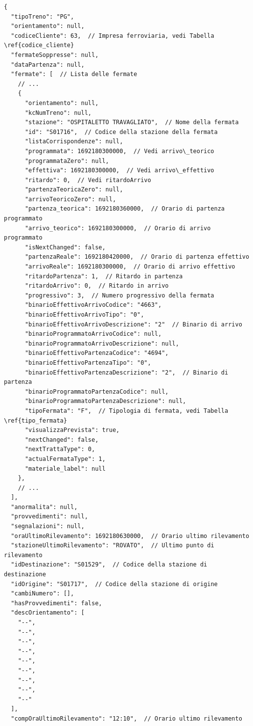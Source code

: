 \documentclass[12pt,italian]{report}
\begin{document}
\begin{verbatim}
{
  "tipoTreno": "PG",
  "orientamento": null,
  "codiceCliente": 63,  // Impresa ferroviaria, vedi Tabella \ref{codice_cliente}
  "fermateSoppresse": null,
  "dataPartenza": null,
  "fermate": [  // Lista delle fermate
    // ...
    {
      "orientamento": null,
      "kcNumTreno": null,
      "stazione": "OSPITALETTO TRAVAGLIATO",  // Nome della fermata
      "id": "S01716",  // Codice della stazione della fermata
      "listaCorrispondenze": null,
      "programmata": 1692180300000,  // Vedi arrivo\_teorico
      "programmataZero": null,
      "effettiva": 1692180300000,  // Vedi arrivo\_effettivo
      "ritardo": 0,  // Vedi ritardoArrivo
      "partenzaTeoricaZero": null,
      "arrivoTeoricoZero": null,
      "partenza_teorica": 1692180360000,  // Orario di partenza programmato
      "arrivo_teorico": 1692180300000,  // Orario di arrivo programmato
      "isNextChanged": false,
      "partenzaReale": 1692180420000,  // Orario di partenza effettivo
      "arrivoReale": 1692180300000,  // Orario di arrivo effettivo
      "ritardoPartenza": 1,  // Ritardo in partenza
      "ritardoArrivo": 0,  // Ritardo in arrivo
      "progressivo": 3,  // Numero progressivo della fermata
      "binarioEffettivoArrivoCodice": "4663",
      "binarioEffettivoArrivoTipo": "0",
      "binarioEffettivoArrivoDescrizione": "2"  // Binario di arrivo
      "binarioProgrammatoArrivoCodice": null,
      "binarioProgrammatoArrivoDescrizione": null,
      "binarioEffettivoPartenzaCodice": "4694",
      "binarioEffettivoPartenzaTipo": "0",
      "binarioEffettivoPartenzaDescrizione": "2",  // Binario di partenza
      "binarioProgrammatoPartenzaCodice": null,
      "binarioProgrammatoPartenzaDescrizione": null,
      "tipoFermata": "F",  // Tipologia di fermata, vedi Tabella \ref{tipo_fermata}
      "visualizzaPrevista": true,
      "nextChanged": false,
      "nextTrattaType": 0,
      "actualFermataType": 1,
      "materiale_label": null
    },
    // ...
  ],
  "anormalita": null,
  "provvedimenti": null,
  "segnalazioni": null,
  "oraUltimoRilevamento": 1692180630000,  // Orario ultimo rilevamento
  "stazioneUltimoRilevamento": "ROVATO",  // Ultimo punto di rilevamento
  "idDestinazione": "S01529",  // Codice della stazione di destinazione
  "idOrigine": "S01717",  // Codice della stazione di origine
  "cambiNumero": [],
  "hasProvvedimenti": false,
  "descOrientamento": [
    "--",
    "--",
    "--",
    "--",
    "--",
    "--",
    "--",
    "--",
    "--"
  ],
  "compOraUltimoRilevamento": "12:10",  // Orario ultimo rilevamento

\end{verbatim}
\end{document}
